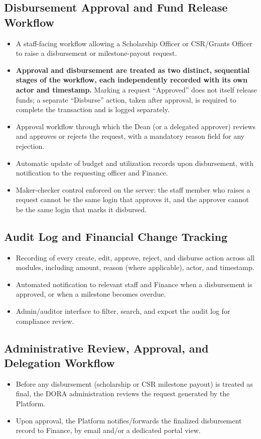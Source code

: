\documentclass[11pt]{article}
\begin{document}
\subsection{Disbursement Approval and Fund Release Workflow}
\begin{itemize}[leftmargin=1.4em, itemsep=3pt]
\item A staff-facing workflow allowing a Scholarship Officer or CSR/Grants Officer to raise a disbursement or milestone-payout request.
\item \textbf{Approval and disbursement are treated as two distinct, sequential stages of the workflow, each independently recorded with its own actor and timestamp.} Marking a request ``Approved'' does not itself release funds; a separate ``Disburse'' action, taken after approval, is required to complete the transaction and is logged separately.
\item Approval workflow through which the Dean (or a delegated approver) reviews and approves or rejects the request, with a mandatory reason field for any rejection.
\item Automatic update of budget and utilization records upon disbursement, with notification to the requesting officer and Finance.
\item Maker-checker control enforced on the server: the staff member who raises a request cannot be the same login that approves it, and the approver cannot be the same login that marks it disbursed.
\end{itemize}

\subsection{Audit Log and Financial Change Tracking}
\label{sec:audit}
\begin{itemize}[leftmargin=1.4em, itemsep=3pt]
\item Recording of every create, edit, approve, reject, and disburse action across all modules, including amount, reason (where applicable), actor, and timestamp.
\item Automated notification to relevant staff and Finance when a disbursement is approved, or when a milestone becomes overdue.
\item Admin/auditor interface to filter, search, and export the audit log for compliance review.
\end{itemize}

\subsection{Administrative Review, Approval, and Delegation Workflow}
\label{sec:admin-review}
\begin{itemize}[leftmargin=1.4em, itemsep=3pt]
\item Before any disbursement (scholarship or CSR milestone payout) is treated as final, the DORA administration reviews the request generated by the Platform.
\item Upon approval, the Platform notifies/forwards the finalized disbursement record to Finance, by email and/or a dedicated portal view.
\end{itemize}
\end{document}
